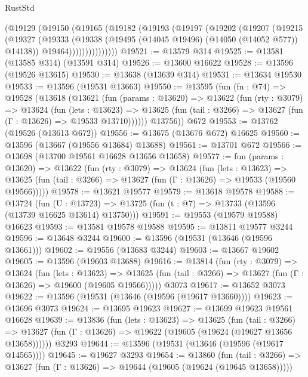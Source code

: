\begin{lexlean}{RustStd}
\begin{coremodule}
            (@19129
              (@19150
                (@19165
                  (@19182
                    (@19193
                      (@19197
                        (@19202
                          (@19207
                            (@19215
                              (@19327
                                (@19333
                                  (@19338 (@19495 (@14045 @19496) (@14050 (@14052 @577)) @14138))
                                  @19464)))))))))))))))
@19521 := @13579 @314
@19525 := @13581 (@13585 @314) (@13591 @314)
@19526 := @13600 @16622
@19528 := @13596 (@19526 @13615)
@19530 := @13638 (@13639 @314)
@19531 := @13634 @19530
@19533 := @13596 (@19531 @13663)
@19550 := @13595
    (fun (fn : @74) =>
    @19528
      (@13618
        (@13621
          (fun (params : @13620) =>
          @13622
            (fun (rty : @3079) =>
            @13624
              (fun (lets : @13623) =>
              @13625 (fun (tail : @3266) => @13627 (fun (Γ : @13626) => @19533 @13710))))))
        @13756))
    @672
@19553 := @13762 (@19526 (@13613 @672))
@19556 := @13675 (@13676 @672) @16625
@19560 := @13596 (@13667 (@19556 @13684) @13688)
@19561 := @13701 @672
@19566 := @13698 (@13700 @19561 @16628 @13656 @13658)
@19577 := fun (params : @13620) =>
  @13622
    (fun (rty : @3079) =>
    @13624
      (fun (lets : @13623) =>
      @13625 (fun (tail : @3266) => @13627 (fun (Γ : @13626) => @19533 (@19560 @19566)))))
@19578 := @13621 @19577
@19579 := @13618 @19578
@19588 := @13724
    (fun (U : @13723) => @13725 (fun (t : @7) => @13733 (@13596 (@13739 @16625 @13614) @13750)))
@19591 := @19553 (@19579 @19588) @16623
@19593 := @13581 @19578 @19588
@19595 := @13811 @19577 @3244
@19596 := @13648 @3244
@19600 := @13596 (@19531 (@13646 (@19596 @13661)))
@19602 := @19556 (@13683 @3244)
@19603 := @13667 @19602
@19605 := @13596 (@19603 @13688)
@19616 := @13814
    (fun (rty : @3079) =>
    @13624
      (fun (lets : @13623) =>
      @13625 (fun (tail : @3266) => @13627 (fun (Γ : @13626) => @19600 (@19605 @19566)))))
    @3073
@19617 := @13652 @3073
@19622 := @13596 (@19531 (@13646 (@19596 (@19617 @13660))))
@19623 := @13696 @3073
@19624 := @13695 @19623
@19627 := @13699 @19623 @19561 @16628
@19639 := @13836
    (fun (lets : @13623) =>
    @13625
      (fun (tail : @3266) =>
      @13627 (fun (Γ : @13626) => @19622 (@19605 (@19624 (@19627 @13656 @13658))))))
    @3293
@19644 := @13596 (@19531 (@13646 (@19596 (@19617 @14565))))
@19645 := @19627 @3293
@19654 := @13860
    (fun (tail : @3266) => @13627 (fun (Γ : @13626) => @19644 (@19605 (@19624 (@19645 @13658)))))

\end{coremodule}
\end{lexlean}
